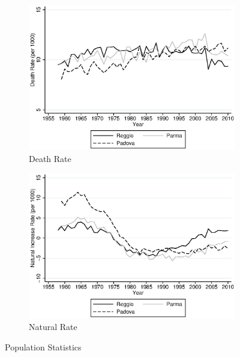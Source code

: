 \begin{figure}[H]
\begin{subfigure}[t]{0.49\textwidth}
          \includegraphics[width=\textwidth]{../../output/image/death_rate.eps} 
        \caption{Death Rate}        
        \end{subfigure}
        \begin{subfigure}[t]{0.49\textwidth}
          \includegraphics[width=\textwidth]{../../output/image/naturalinc_rate.eps}
            \caption{Natural Rate}       
        \end{subfigure}
      \caption{Population Statistics}  \label{fig:population}
    \end{figure}
    


